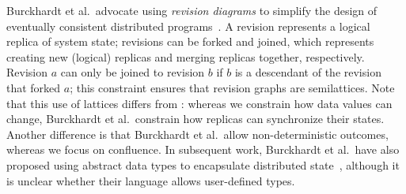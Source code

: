 Burckhardt et al.\ advocate using \emph{revision diagrams} to simplify the
design of eventually consistent distributed programs~\cite{Burckhardt2012a}. A
revision represents a logical replica of system state; revisions can be forked
and joined, which represents creating new (logical) replicas and merging
replicas together, respectively. Revision $a$ can only be joined to revision $b$
if $b$ is a descendant of the revision that forked $a$; this constraint ensures
that revision graphs are semilattices. Note that this use of lattices differs
from \lang: whereas we constrain how data values can change, Burckhardt et al.\
constrain how replicas can synchronize their states. Another difference is that
Burckhardt et al.\ allow non-deterministic outcomes, whereas we focus on
confluence. In subsequent work, Burckhardt et al.\ have also proposed using
abstract data types to encapsulate distributed state~\cite{Burckhardt2012b},
although it is unclear whether their language allows user-defined types.





